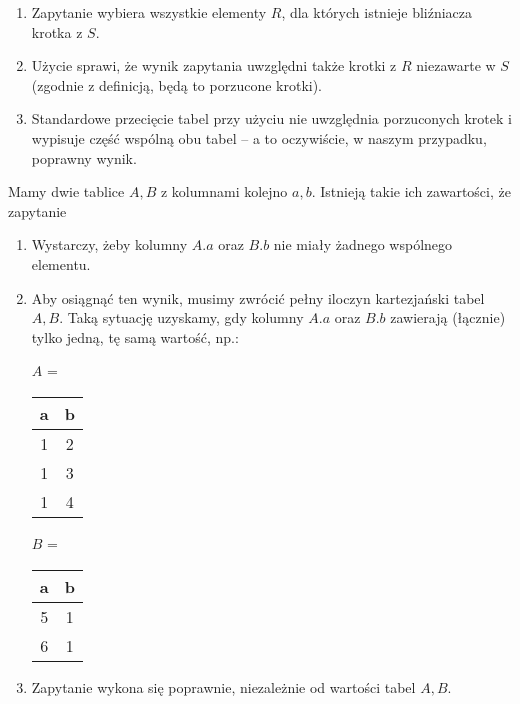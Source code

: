 \begin{solutions}
    \begin{enumerate}[\bf A.]
    	\item Zapytanie wybiera wszystkie elementy $R$, dla których istnieje bliźniacza krotka z $S$.
    	\item Użycie  sprawi, że wynik zapytania uwzględni także krotki z $R$ niezawarte w $S$ (zgodnie z definicją, będą to porzucone krotki).
    	\item Standardowe przecięcie tabel przy użyciu  nie uwzględnia porzuconych krotek i wypisuje część wspólną obu tabel -- a to oczywiście, w naszym przypadku, poprawny wynik.
    \end{enumerate}

    \sol Mamy dwie tablice $A, B$ z kolumnami kolejno $a, b$. Istnieją takie ich zawartości, że zapytanie
    \begin{center}
    \end{center}
    
    \begin{enumerate}[\bf A.]
    	\item Wystarczy, żeby kolumny $A.a$ oraz $B.b$ nie miały żadnego wspólnego elementu.
    	\item Aby osiągnąć ten wynik, musimy zwrócić pełny iloczyn kartezjański tabel $A, B$. Taką sytuację uzyskamy, gdy kolumny $A.a$ oraz $B.b$ zawierają (łącznie) tylko jedną, tę samą wartość, np.:
    	\begin{center}
    		$A$ = \begin{tabular}{c|c}
    			a & b \\ \hline
    			1 & 2 \\
    			1 & 3 \\
    			1 & 4                        
    		\end{tabular}
    		\hspace{20pt}
    		$B$ = \begin{tabular}{c|c}
    			a & b \\ \hline
    			5 & 1 \\
    			6 & 1                        
    		\end{tabular}
    	\end{center}
    	\item Zapytanie wykona się poprawnie, niezależnie od wartości tabel $A, B$.
    \end{enumerate}


\end{solutions}
